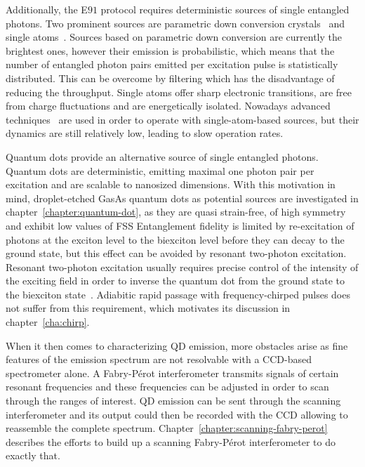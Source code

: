 Additionally, the E$91$ protocol requires deterministic sources of single entangled photons.
Two prominent sources are parametric down conversion crystals~\cite{shih_new_1988} and single atoms~\cite{aspect_experimental_1981}.
Sources based on parametric down conversion are currently the brightest ones, however their emission is probabilistic, which means that the number of entangled photon pairs emitted per excitation pulse is statistically distributed.
This can be overcome by filtering which has the disadvantage of reducing the throughput.
Single atoms offer sharp electronic transitions, are free from charge fluctuations and are energetically isolated.
Nowadays advanced techniques~\cite{kuhn_deterministic_2002} are used in order to operate with single-atom-based sources, but their dynamics are still relatively low, leading to slow operation rates.

Quantum dots provide an alternative source of single entangled photons.
Quantum dots are deterministic, emitting maximal one photon pair per excitation and are scalable to nanosized dimensions.
With this motivation in mind, droplet-etched GasAs quantum dots as potential sources are investigated in chapter~\ref{chapter:quantum-dot}, as they are quasi strain-free, of high symmetry and exhibit low values of \ac{FSS}
Entanglement fidelity is limited by re-excitation of photons at the exciton level to the biexciton level before they can decay to the ground state, but this effect can be avoided by resonant two-photon excitation.
Resonant two-photon excitation usually requires precise control of the intensity of the exciting field in order to inverse the quantum dot from the ground state to the biexciton state~\cite{jayakumar_deterministic_2013}.
Adiabitic rapid passage with frequency-chirped pulses does not suffer from this requirement, which motivates its discussion in chapter~\ref{cha:chirp}.

When it then comes to characterizing \ac{QD} emission, more obstacles arise as fine features of the emission spectrum are not resolvable with a CCD-based spectrometer alone.
A Fabry-Pérot interferometer transmits signals of certain resonant frequencies and these frequencies can be adjusted in order to scan through the ranges of interest.
\ac{QD} emission can be sent through the scanning interferometer and its output could then be recorded with the CCD allowing to reassemble the complete spectrum.
Chapter~\ref{chapter:scanning-fabry-perot} describes the efforts to build up a scanning Fabry-Pérot interferometer to do exactly that.


